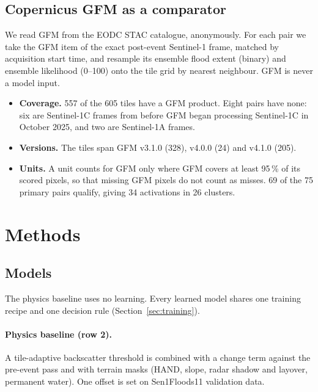 \documentclass[10pt,twocolumn,a4paper]{article}
\newcommand{\pp}{\,\%}
\begin{document}
\subsection{Copernicus GFM as a comparator}\label{sec:gfmdata}
We read GFM from the EODC STAC catalogue, anonymously.
For each pair we take the GFM item of the exact post-event Sentinel-1 frame, matched by acquisition start time, and
resample its ensemble flood extent (binary) and ensemble likelihood (0--100) onto the tile grid by nearest neighbour.
GFM is never a model input.
\begin{itemize}
  \item \textbf{Coverage.} 557 of the 605 tiles have a GFM product. Eight pairs have none: six are Sentinel-1C frames
    from before GFM began processing Sentinel-1C in October 2025, and two are Sentinel-1A frames.
  \item \textbf{Versions.} The tiles span GFM v3.1.0 (328), v4.0.0 (24) and v4.1.0 (205).
  \item \textbf{Units.} A unit counts for GFM only where GFM covers at least 95\pp{} of its scored pixels, so that missing
    GFM pixels do not count as misses. 69 of the 75 primary pairs qualify, giving 34 activations in 26 clusters.
\end{itemize}

\section{Methods}\label{sec:methods}

\subsection{Models}
The physics baseline uses no learning. Every learned model shares one training recipe and one decision rule
(Section~\ref{sec:training}).

\paragraph{Physics baseline (row 2).} A tile-adaptive backscatter threshold is combined with a change term against the
pre-event pass and with terrain masks (HAND, slope, radar shadow and layover, permanent water). One offset is set on
Sen1Floods11 validation data.
\end{document}
